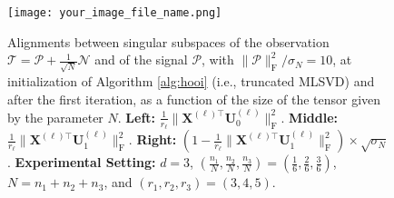 \documentclass{article}
\begin{document}
\begin{figure}[h]
    \centering
    \texttt{[image: your\_image\_file\_name.png]}
    \caption{
    Alignments between singular subspaces of the observation ${\bm{\mathscr{T}}} = {\bm{\mathscr{P}}} + \frac{1}{\sqrt{N}}{\bm{\mathscr{N}}}$ and of the signal ${\bm{\mathscr{P}}}$, with $\lVert{\bm{\mathscr{P}}} \rVert_{\mathrm{F}}^2 / \sigma_N = 10$, at initialization of Algorithm \ref{alg:hooi} (i.e., truncated MLSVD) and after the first iteration, as a function of the size of the tensor given by the parameter $N$. 
    \textbf{Left:} $\frac{1}{r_\ell} \lVert{\bm{X}}^{(\ell) \top} {\bm{U}}^{(\ell)}_0 \rVert_{\mathrm{F}}^2$.
    \textbf{Middle:} $\frac{1}{r_\ell} \lVert{\bm{X}}^{(\ell) \top} {\bm{U}}^{(\ell)}_1 \rVert_{\mathrm{F}}^2$.
    \textbf{Right:} $(1 - \frac{1}{r_\ell} \lVert{\bm{X}}^{(\ell) \top} {\bm{U}}^{(\ell)}_1 \rVert_{\mathrm{F}}^2) \times \sqrt{\sigma_N}$.
    \textbf{Experimental Setting:} $d = 3$, $(\frac{n_1}{N}, \frac{n_2}{N}, \frac{n_3}{N}) = (\frac{1}{6}, \frac{2}{6}, \frac{3}{6})$, $N = n_1 + n_2 + n_3$, and $(r_1, r_2, r_3) = (3, 4, 5)$.
    }
    \label{fig:alignment_figure}
\end{figure}
\end{document}
